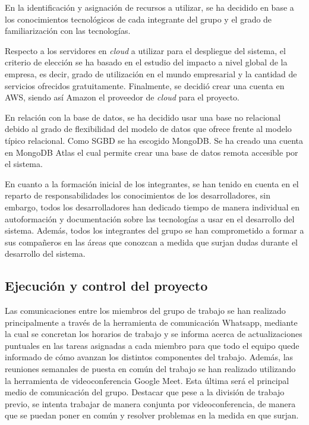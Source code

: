 \documentclass{article}
\begin{document}
En la identificación y asignación de recursos a utilizar, se ha decidido en base a los conocimientos tecnológicos de cada integrante del grupo y el grado de familiarización con las tecnologías.
 
Respecto a los servidores en \textit{cloud} a utilizar para el despliegue del sistema, el criterio de elección se ha basado en el estudio del impacto a nivel global de la empresa, es decir, grado de utilización en el mundo empresarial y la cantidad de servicios ofrecidos gratuitamente. Finalmente, se decidió crear una cuenta en AWS, siendo así Amazon el proveedor de \textit{cloud} para el proyecto.
 
En relación con la base de datos, se ha decidido usar una base no relacional debido al grado de flexibilidad del modelo de datos que ofrece frente al modelo típico relacional. Como SGBD se ha escogido MongoDB. Se ha creado una cuenta en MongoDB Atlas el cual permite crear una base de datos remota accesible por el sistema.
 
En cuanto a la formación inicial de los integrantes, se han tenido en cuenta en el reparto de responsabilidades los conocimientos de los desarrolladores, sin embargo, todos los desarrolladores han dedicado tiempo de manera individual en autoformación y documentación sobre las tecnologías a usar en el desarrollo del sistema. Además, todos los integrantes del grupo se han comprometido a formar a sus compañeros en las áreas que conozcan a medida que surjan dudas durante el desarrollo del sistema.
 
\subsection{Ejecución y control del proyecto}
 
Las comunicaciones entre los miembros del grupo de trabajo se han realizado principalmente a través de la herramienta de comunicación Whatsapp, mediante la cual se concretan los horarios de trabajo y se informa acerca de actualizaciones puntuales en las tareas asignadas a cada miembro para que todo el equipo quede informado de cómo avanzan los distintos componentes del trabajo. Además, las reuniones semanales de puesta en común del trabajo se han realizado utilizando la herramienta de videoconferencia Google Meet. Esta última será el principal medio de comunicación del grupo. Destacar que pese a la división de trabajo previo, se intenta trabajar de manera conjunta por videoconferencia, de manera que se puedan poner en común y resolver problemas en la medida en que surjan.
 
\end{document}
